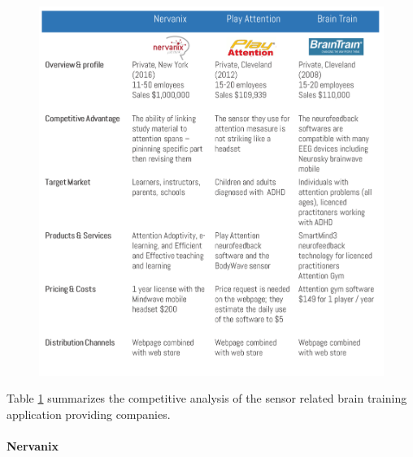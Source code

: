 \documentclass[letterpaper,10pt]{article}
\begin{document}
\begin{figure}[!htb]
\centering
\includegraphics[scale=0.5]{sensor_comp.PNG}
\label{img:sensorapps_tabla}
\end{figure}

\newpage

Table \ref{img:sensorapps_tabla} summarizes the competitive analysis of the sensor related brain training application providing companies.

\paragraph{Nervanix}
\end{document}

